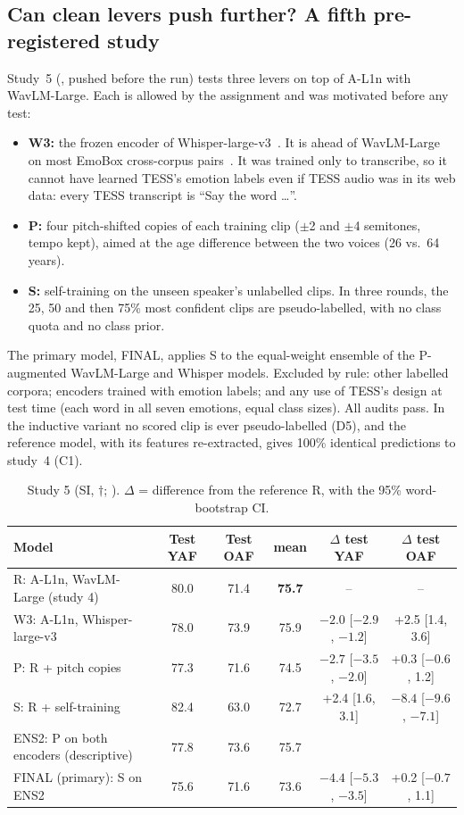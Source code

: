 \subsection{Can clean levers push further? A fifth pre-registered study}\label{sec:final}
Study~5 (, pushed before the run) tests three levers on top of A-L1n with WavLM-Large. Each is allowed by the assignment and was motivated before any test:
\begin{itemize}\setlength\itemsep{1pt}
\item \textbf{W3:} the frozen encoder of Whisper-large-v3~\cite{whisper}. It is ahead of WavLM-Large on most EmoBox cross-corpus pairs~\cite{emobox}. It was trained only to transcribe, so it cannot have learned TESS's emotion labels even if TESS audio was in its web data: every TESS transcript is ``Say the word \dots''.
\item \textbf{P:} four pitch-shifted copies of each training clip ($\pm$2 and $\pm$4 semitones, tempo kept), aimed at the age difference between the two voices (26 vs.\ 64 years).
\item \textbf{S:} self-training on the unseen speaker's unlabelled clips. In three rounds, the 25, 50 and then 75\% most confident clips are pseudo-labelled, with no class quota and no class prior.
\end{itemize}
The primary model, FINAL, applies S to the equal-weight ensemble of the P-augmented WavLM-Large and Whisper models.
Excluded by rule: other labelled corpora; encoders trained with emotion labels; and any use of TESS's design at test time (each word in all seven emotions, equal class sizes).
All audits pass. In the inductive variant no scored clip is ever pseudo-labelled (D5), and the reference model, with its features re-extracted, gives 100\% identical predictions to study~4 (C1).
\begin{table}[H]\centering\small
\caption[Study 5: Whisper encoder, pitch augmentation and self-training]{Study 5 (SI, $\dagger$; ). $\Delta$ = difference from the reference R, with the 95\% word-bootstrap CI.}\label{tab:final}
\begin{tabular}{@{}lccccc@{}}\toprule
Model & Test YAF & Test OAF & mean & $\Delta$ test YAF & $\Delta$ test OAF\\\midrule
R: A-L1n, WavLM-Large (study 4) & 80.0 & 71.4 & \textbf{75.7} & -- & --\\
W3: A-L1n, Whisper-large-v3 & 78.0 & 73.9 & 75.9 & $-2.0$ [$-2.9$, $-1.2$] & +2.5 [1.4, 3.6]\\
P: R + pitch copies & 77.3 & 71.6 & 74.5 & $-2.7$ [$-3.5$, $-2.0$] & +0.3 [$-0.6$, 1.2]\\
S: R + self-training & 82.4 & 63.0 & 72.7 & +2.4 [1.6, 3.1] & $-8.4$ [$-9.6$, $-7.1$]\\
ENS2: P on both encoders (descriptive) & 77.8 & 73.6 & 75.7 & & \\
FINAL (primary): S on ENS2 & 75.6 & 71.6 & 73.6 & $-4.4$ [$-5.3$, $-3.5$] & +0.2 [$-0.7$, 1.1]\\\bottomrule
\end{tabular}\end{table}
